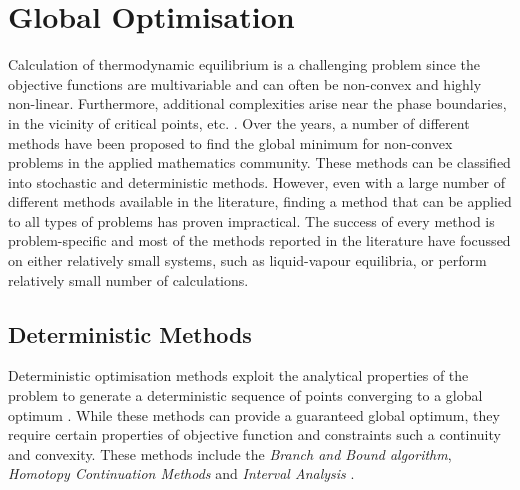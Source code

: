 	\section{Global Optimisation}
	Calculation of thermodynamic equilibrium is a challenging problem since the objective functions are multivariable and can often be non-convex and highly non-linear. Furthermore, additional complexities arise near the phase boundaries, in the vicinity of critical points, etc. \cite{Wakeham04,TEH2002745}. Over the years, a number of different methods have been proposed to find the global minimum for non-convex problems in the applied mathematics community. These methods can be classified into stochastic and deterministic methods. However, even with a large number of different methods available in the literature, finding a method that can be applied to all types of problems has proven impractical. The success of every method is problem-specific and most of the methods reported in the literature have focussed on either relatively small systems, such as liquid-vapour equilibria, or perform relatively small number of calculations.

	\subsection{Deterministic Methods}
	Deterministic optimisation methods exploit the analytical properties of the problem to generate a deterministic sequence of points converging to a global optimum \cite{PARDALOS2000209}. While these methods can provide a guaranteed global optimum, they require certain properties of objective function and constraints such a continuity and convexity. These methods include the \emph{Branch and Bound algorithm}, \emph{Homotopy Continuation Methods}  and \emph{Interval Analysis} \cite{Floudas99}.

